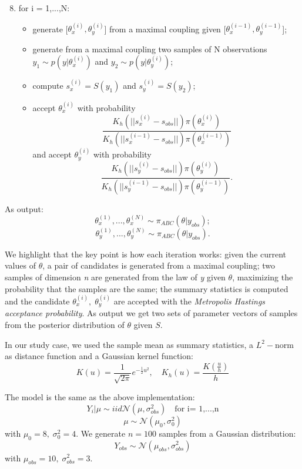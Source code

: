 \documentclass[11pt,a4paper,oneside]{report}
\begin{document}
\begin{enumerate}
	\setcounter{enumi}{7}	
	
	\item for i = 1,...,N:
	\begin{itemize}
		\item generate [$\theta_{x}^{(i)},\theta_{y}^{(i)}$] from a maximal coupling given [$\theta_{x}^{(i-1)},\theta_{y}^{(i-1)}$];
		\item generate from a maximal coupling two samples of N observations $y_{1} \sim p(y|\theta_{x}^{(i)})$ and $y_{2} \sim p(y|\theta_{y}^{(i)})$;
		\item compute $s_{x}^{(i)}=S(y_{1})$ and $s_{y}^{(i)}=S(y_{2})$;
		\item accept $\theta_{x}^{(i)}$ with probability 
		$$
		\frac{
			K_h(||s_{x}^{(i)}-s_{obs}||)\pi(\theta_{x}^{(i)})
		}{
			K_h(||s_{x}^{(i-1)}-s_{obs}||)\pi(\theta_{x}^{(i-1)})
		}
		$$
		and accept $\theta_{y}^{(i)}$ with probability
		$$
		\frac{
			K_h(||s_{y}^{(i)}-s_{obs}||)\pi(\theta_{y}^{(i)})
		}{
			K_h(||s_{y}^{(i-1)}-s_{obs}||)\pi(\theta_{y}^{(i-1)})
		}.
		$$ 
	\end{itemize}
	
	
\end{enumerate}


As output: 
$$\theta_{x}^{(1)},...,\theta_{x}^{(N)}\sim \pi_{ABC} (\theta|y_{obs});$$
$$\theta_{y}^{(1)},...,\theta_{y}^{(N)} \sim \pi_{ABC} (\theta|y_{obs}).$$


\vspace{0.2cm}
We highlight that the key point is how each iteration works:
given the current values of $\theta$, a pair of candidates is generated from a maximal coupling; two samples of dimension \emph{n} are generated from the law of \emph{y} given $\theta$, maximizing the probability that the samples are the same;
the summary statistics is computed and the candidate $\theta_x ^{(i)}, \; \theta_y ^{(i)}$ are accepted with the \emph{Metropolis Hastings acceptance probability}. As output  we get two sets of parameter vectors of samples from the posterior distribution of $\theta$ given $S$.

In our study case, we used the sample mean as summary statistics, a $L^2-$norm as distance function and a Gaussian kernel function:
	$$
K(u) = 
\frac{1}{\sqrt{2\pi}} e^{-\frac{1}{2}u^2}, 
\quad K_h(u) 
= \frac{K(\frac u h)}{h}
$$ 

The model is the same as the above implementation: 
$$ Y_i | \mu \sim{iid} \mathcal{N}(\mu, \sigma_{obs} ^2) \quad \text{for i= 1,...,n} $$
$$ \mu  \sim \mathcal{N}(\mu_0, \sigma_0^2)$$
with $\mu_0 = 8, \; \sigma^2_0 = 4$.
We generate $n= 100$ samples from a Gaussian distribution:
$$
Y_{obs} \sim \mathcal{N}(\mu_{obs}, \sigma_{obs} ^2)
$$
with
$
\mu_{obs} = 10, \;
\sigma_{obs} ^2 = 3
$.
\end{document}
